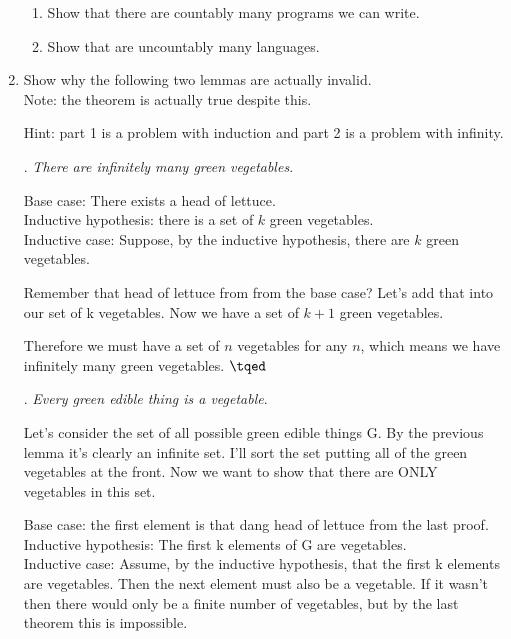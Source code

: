 \documentclass[basic, header]{nosvagor-notes}
\begin{document}
\begin{enumerate}[itemsep=4em]
    \begin{enumerate}[leftmargin=2em]

      \item Show that there are countably many programs we can write.

      \item Show that are uncountably many languages.

    \end{enumerate}

  \newpage %

  \item Show why the following two lemmas are actually invalid.\\

    Note: the theorem is actually true despite this.

    Hint: part 1 is a problem with induction and part 2 is a problem with
    infinity.

    . \textit{There are infinitely many green vegetables}.


    Base case: There exists a head of lettuce.\\
    Inductive hypothesis: there is a set of \(k\) green vegetables.\\
    Inductive case: Suppose, by the inductive hypothesis, there are \(k\) green vegetables.

    Remember that head of lettuce from from the base case? Let’s add that into our set of k vegetables.
    Now we have a set of \(k + 1\) green vegetables.

    Therefore we must have a set of \(n\) vegetables for any \(n\), which means
    we have infinitely many green vegetables. \(\tqed\)

    . \textit{Every green edible thing is a vegetable}.


    Let’s consider the set of all possible green edible things G. By the
    previous lemma it’s clearly an infinite set. I’ll sort the set putting all
    of the green vegetables at the front. Now we want to show that there are
    ONLY vegetables in this set.

    Base case: the first element is that dang head of lettuce from the last
    proof.\\ Inductive hypothesis: The first k elements of G are vegetables.\\
    Inductive case: Assume, by the inductive hypothesis, that the first k
    elements are vegetables. Then the next element must also be a vegetable. If
    it wasn't then there would only be a finite number of vegetables, but by
    the last theorem this is impossible.


\end{enumerate}
\end{document}
